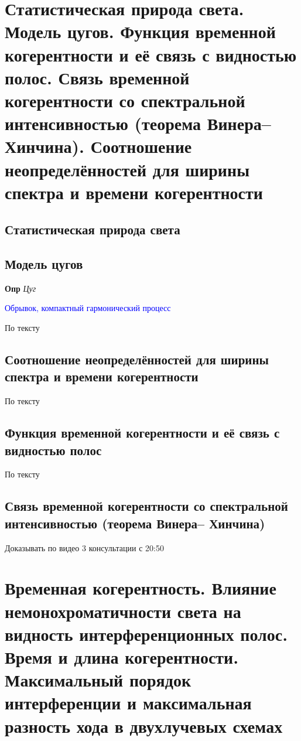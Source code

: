 \documentclass[a4paper, 14pt]{article}
\begin{document}
    \section{Статистическая природа света.
    Модель цугов.
    Функция временной когерентности и её связь с видностью полос.
    Связь временной когерентности со спектральной интенсивностью (теорема Винера– Хинчина).
    Соотношение неопределённостей для ширины спектра и времени когерентности}
    
    \subsection{Статистическая природа света}
    
    \subsection{Модель цугов}
    
    \textbf{Опр} \textit{Цуг}
    
    \textcolor{blue}{Обрывок, компактный гармонический процесс}
    
    По тексту
    
    \subsection{Соотношение неопределённостей для ширины спектра и времени когерентности}
    
    По тексту
    
    \subsection{Функция временной когерентности и её связь с видностью полос}
    
    По тексту
    
    \subsection{Связь временной когерентности со спектральной интенсивностью (теорема Винера– Хинчина)}
    
    Доказывать по видео 3 консультации с 20:50
    
    \section{Временная когерентность.
    Влияние немонохроматичности света на видность интерференционных полос.
    Время и длина когерентности.
    Максимальный порядок интерференции и максимальная разность хода в двухлучевых схемах}
    
\end{document}
